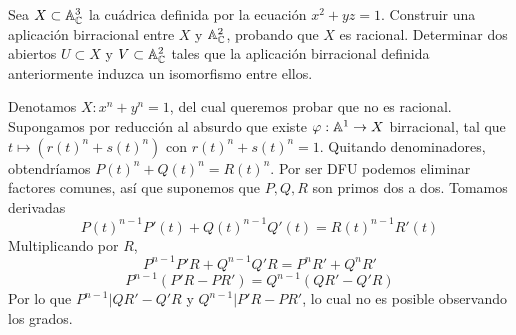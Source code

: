 \documentclass[twoside]{article}
\begin{document}
\newpage

\begin{ejercicio}{2} Sea $X\subset \mathbb{A}^3_{\mathbb{C}}$ la cuádrica definida por la ecuación $x^2 + yz =1$. Construir una aplicación birracional entre $X$ y $\mathbb{A}^2_{\mathbb{C}}$, probando que $X$ es racional. Determinar dos abiertos $U\subset X$ y $V\subset \mathbb{A}^2_{\mathbb{C}}$ tales que la aplicación birracional definida anteriormente induzca un isomorfismo entre ellos.
\end{ejercicio}
\begin{solucion}
\end{solucion}
\newpage 

\begin{ejercicio}{4}
\end{ejercicio}
\begin{solucion}
Denotamos $X: x^n+y^n=1$, del cual queremos probar que no es racional. Supongamos por reducción al absurdo que existe $\varphi:\mathbb{A}^1\to X$ birracional, tal que $t\mapsto (r(t)^n+s(t)^n)$ con $r(t)^n+s(t)^n=1$.  Quitando denominadores, obtendríamos $P(t)^n+Q(t)^n=R(t)^n$. Por ser DFU podemos eliminar factores comunes, así que suponemos que $P,Q,R$ son primos dos a dos. Tomamos derivadas
$$P(t)^{n-1}P'(t)+Q(t)^{n-1}Q'(t)=R(t)^{n-1}R'(t)$$
Multiplicando por $R$, 
$$P^{n-1}P'R+Q^{n-1}Q'R=P^nR'+Q^nR'$$
$$P^{n-1}(P'R-PR')=Q^{n-1}(QR'-Q'R)$$
Por lo que $P^{n-1}|QR'-Q'R$ y $Q^{n-1}|P'R-PR'$, lo cual no es posible observando los grados.
\end{solucion}
\end{document}
